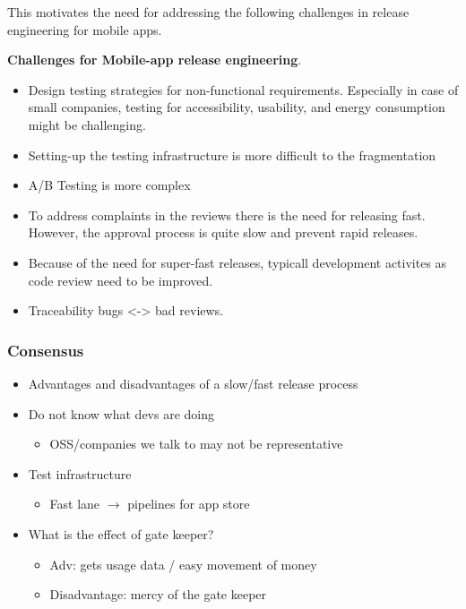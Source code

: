 \documentclass[a4paper]{article}
\newcommand{\smallsection}[1]{\noindent \textbf{#1}. }
\begin{document}
This motivates the need for addressing the following challenges in
release engineering for mobile apps.

\smallsection{Challenges for Mobile-app release
engineering}

\begin{itemize}
\tightlist
\item
  Design testing strategies for non-functional requirements. Especially
  in case of small companies, testing for accessibility, usability, and
  energy consumption might be challenging.
\item
  Setting-up the testing infrastructure is more difficult to the
  fragmentation
\item
  A/B Testing is more complex
\item
  To address complaints in the reviews there is the need for releasing
  fast. However, the approval process is quite slow and prevent rapid
  releases.
\item
  Because of the need for super-fast releases, typicall development
  activites as code review need to be improved.
\item
  Traceability bugs \textless{}-\textgreater{} bad reviews.
\end{itemize}

\subsubsection{Consensus}

\begin{itemize}
\tightlist
    \item Advantages and disadvantages of a slow/fast release process
    \item Do not know what devs are doing
    \begin{itemize}
    \tightlist
        \item OSS/companies we talk to may not be representative
    \end{itemize}
    \item Test infrastructure
    \begin{itemize}
    \tightlist
        \item Fast lane $\rightarrow$ pipelines for app store
    \end{itemize}
    \item What is the effect of gate keeper?
    \begin{itemize}
    \tightlist
        \item Adv: gets usage data / easy movement of money
        \item Disadvantage: mercy of the gate keeper
    \end{itemize}
\end{itemize}
\end{document}
